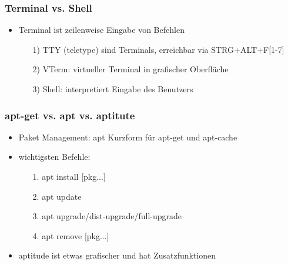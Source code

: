\documentclass[12pt,utf8]{beamer}
\begin{document}
\begin{frame}
\frametitle{Terminal vs. Shell}
\begin{itemize}
	\item Terminal ist zeilenweise Eingabe von Befehlen
	\begin{itemize}
		\item[1)] TTY (teletype) sind Terminals, erreichbar via STRG+ALT+F[1-7]
		\item[2)] VTerm: virtueller Terminal in grafischer Oberfläche
		\item[3)] Shell: interpretiert Eingabe des Benutzers
	\end{itemize}
\end{itemize}
\end{frame}

\begin{frame}
\frametitle{apt-get vs. apt vs. aptitute}
\begin{itemize}
	\item Paket Management: apt Kurzform für apt-get und apt-cache
	\item wichtigsten Befehle:
	\begin{itemize}
		\item[1.] apt install [pkg...]
		\item[2.] apt update
		\item[3.] apt upgrade/dist-upgrade/full-upgrade
		\item[4.] apt remove [pkg...]
	\end{itemize}
	\item aptitude ist etwas grafischer und hat Zusatzfunktionen
\end{itemize}
\end{frame}
\end{document}
